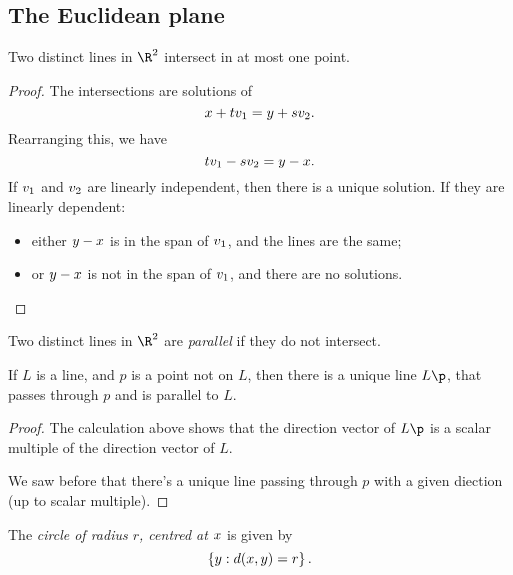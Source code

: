 
\subsection{The Euclidean plane}  %
\label{sub:the_euclidean_plane}

\begin{proposition}
	Two distinct lines in $\R^2$ intersect in at most one point. %
\end{proposition}

\begin{proof}
	The intersections are solutions of
	\begin{equation*}
		x+tv_1 = y+sv_2.
	\end{equation*}
	Rearranging this, we have
	\begin{equation*}
		tv_1 - sv_2 = y-x.
	\end{equation*}
	If $v_1$ and $v_2$ are linearly independent, then there is a unique solution. If they are linearly dependent:
	\begin{itemize}
		\shortskip
		\item either $y-x$ is in the span of $v_1$, and the lines are the same;
		\item or $y-x$ is not in the span of $v_1$, and there are no solutions. \qedhere
	\end{itemize}
\end{proof}

\begin{definition}
	Two distinct lines in $\R^2$ are \emph{parallel} if they do not intersect. %
\end{definition}

\begin{corollary}
	If $L$ is a line, and $p$ is a point not on $L$, then there is a unique line $L\p$, that passes through $p$ and is parallel to $L$. %
\end{corollary}

\begin{proof}
	The calculation above shows that the direction vector of $L\p$ is a scalar multiple of the direction vector of $L$.

	We saw before that there's a unique line passing through $p$ with a given diection (up to scalar multiple). %
\end{proof}

\begin{definition}
	The \emph{circle of radius $r$, centred at $x$} is given by
	\begin{equation*}
		\left\{ y : d(x,y) = r\right\}.
	\end{equation*}
\end{definition}

